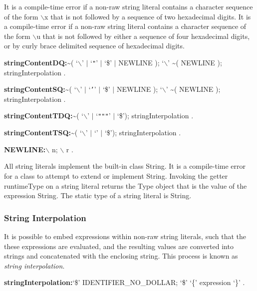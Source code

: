 \documentclass{article}
\newcommand{\code}[1]{{\sf #1}}
\begin{document}
\LMHash{}
It is a compile-time error if a non-raw string literal contains a character sequence of the form $\backslash$x that is not followed by a sequence of two hexadecimal digits. It is a compile-time error if a non-raw string literal  contains a character sequence of the form $\backslash$u that is not followed by either a sequence of four hexadecimal digits, or by curly brace delimited sequence of hexadecimal digits.



\begin{grammar}
 {\bf stringContentDQ:}\~{}( `$\backslash$' $|$ `{\escapegrammar \texttt{"}}' $|$ `\$' $|$ NEWLINE );
      `$\backslash$'  \~{}( NEWLINE );
     stringInterpolation
    .

 {\bf stringContentSQ:}\~{}( `$\backslash$' $|$ `{\escapegrammar \texttt{'}}' $|$ `\$' $|$ NEWLINE );
      `$\backslash$'  \~{}( NEWLINE );
     stringInterpolation
    .

    
 {\bf stringContentTDQ:}\~{}( `$\backslash$' $|$  `{\escapegrammar \texttt{"""}}' $|$ `\$');
     stringInterpolation
    .    

 {\bf stringContentTSQ:}\~{}( `$\backslash$' $|$ `{\escapegrammar \code{'}\code{'}\code{'}}' $|$ `\$');
     stringInterpolation
    .
    
{\bf NEWLINE:}$\backslash$ n;
      $\backslash$ r
    .

 \end{grammar}
 
\LMHash{}
All string literals implement the built-in class \code{String}. It is a compile-time error for a class to attempt to extend or implement \code{String}. Invoking the getter \code{runtimeType} on a string literal returns the \code{Type} object that is the value of the expression \code{String}. The static type of a string literal is \code{String}.

\subsubsection{String Interpolation}

\LMHash{}
It is possible to embed expressions within non-raw string literals, such that the these expressions are evaluated, and the resulting values are converted into strings and concatenated with the enclosing string. This process is known as {\em string interpolation}.

 \begin{grammar}
{\bf stringInterpolation:}`\$' IDENTIFIER\_NO\_DOLLAR;
      `\$' `\{' expression `\}' %
    .
 \end{grammar}
 
\end{document}
